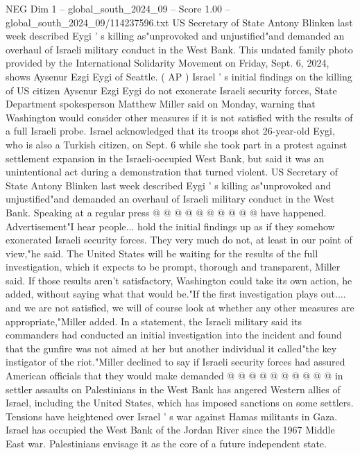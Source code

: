 \begin{textsample}{NEG Dim 1 – global\_south\_2024\_09 – Score 1.00 – global\_south\_2024\_09/114237596.txt}  \label{ex:f1_neg_245}
US Secretary of State Antony Blinken last week described Eygi ' s killing as"unprovoked and unjustified"and demanded an overhaul of Israeli military conduct in the West Bank.
This undated family photo provided by the International Solidarity Movement on Friday, Sept. 6, 2024, shows Aysenur Ezgi Eygi of Seattle. ( AP ) Israel ' s initial findings on the killing of US citizen Aysenur Ezgi Eygi do not exonerate Israeli security forces, State Department spokesperson Matthew Miller said on Monday, warning that Washington would consider other measures if it is not satisfied with the results of a full Israeli probe.
Israel acknowledged that its troops shot 26-year-old Eygi, who is also a Turkish citizen, on Sept. 6 while she took part in a protest against settlement expansion in the Israeli-occupied West Bank, but said it was an unintentional act during a demonstration that turned violent.
US Secretary of State Antony Blinken last week described Eygi ' s killing as"unprovoked and unjustified"and demanded an overhaul of Israeli military conduct in the West Bank.
Speaking at a regular press @ @ @ @ @ @ @ @ @ @ have happened.
Advertisement"I hear people... hold the initial findings up as if they somehow exonerated Israeli security forces.
They very much do not, at least in our point of view,"he said.
The United States will be waiting for the results of the full investigation, which it expects to be prompt, thorough and transparent, Miller said.
If those results aren't satisfactory, Washington could take its own action, he added, without saying what that would be."If the first investigation plays out.... and we are not satisfied, we will of course look at whether any other measures are appropriate,"Miller added.
In a statement, the Israeli military said its commanders had conducted an initial investigation into the incident and found that the gunfire was not aimed at her but another individual it called"the key instigator of the riot."Miller declined to say if Israeli security forces had assured American officials that they would make demanded @ @ @ @ @ @ @ @ @ @ in settler assaults on Palestinians in the West Bank has angered Western allies of Israel, including the United States, which has imposed sanctions on some settlers.
Tensions have heightened over Israel ' s war against Hamas militants in Gaza.
Israel has occupied the West Bank of the Jordan River since the 1967 Middle East war.
Palestinians envisage it as the core of a future independent state.

\end{textsample}

